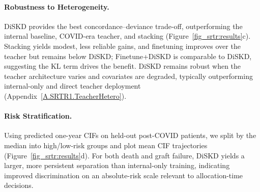 \documentclass{article}
\theoremstyle{plain}
\theoremstyle{definition}
\theoremstyle{remark}
\begin{document}





\paragraph{Robustness to Heterogeneity.}
DiSKD provides the best concordance–deviance trade-off, outperforming the internal baseline, COVID-era teacher, and stacking (Figure~\ref{fig_srtr:results}c). Stacking yields modest, less reliable gains, and finetuning improves over the teacher but remains below DiSKD; Finetune+DiSKD is comparable to DiSKD, suggesting the KL term drives the benefit. DiSKD remains robust when the teacher architecture varies and covariates are degraded, typically outperforming internal-only and direct teacher deployment (Appendix~\ref{A.SRTR1.TeacherHetero}).




\paragraph{Risk Stratification.}
 Using predicted one-year CIFs on held-out post-COVID patients, we split by the median into high/low-risk groups and plot mean CIF trajectories (Figure~\ref{fig_srtr:results}d). For both death and graft failure, DiSKD yields a larger, more persistent separation than internal-only training, indicating improved discrimination on an absolute-risk scale relevant to allocation-time decisions.
\end{document}

